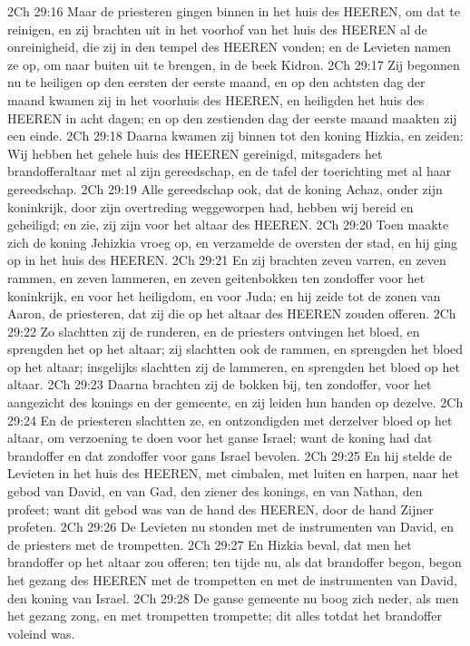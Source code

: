 2Ch 29:16  Maar de priesteren gingen binnen in het huis des HEEREN, om dat te reinigen, en zij brachten uit in het voorhof van het huis des HEEREN al de onreinigheid, die zij in den tempel des HEEREN vonden; en de Levieten namen ze op, om naar buiten uit te brengen, in de beek Kidron.
2Ch 29:17  Zij begonnen nu te heiligen op den eersten der eerste maand, en op den achtsten dag der maand kwamen zij in het voorhuis des HEEREN, en heiligden het huis des HEEREN in acht dagen; en op den zestienden dag der eerste maand maakten zij een einde.
2Ch 29:18  Daarna kwamen zij binnen tot den koning Hizkia, en zeiden: Wij hebben het gehele huis des HEEREN gereinigd, mitsgaders het brandofferaltaar met al zijn gereedschap, en de tafel der toerichting met al haar gereedschap.
2Ch 29:19  Alle gereedschap ook, dat de koning Achaz, onder zijn koninkrijk, door zijn overtreding weggeworpen had, hebben wij bereid en geheiligd; en zie, zij zijn voor het altaar des HEEREN.
2Ch 29:20  Toen maakte zich de koning Jehizkia vroeg op, en verzamelde de oversten der stad, en hij ging op in het huis des HEEREN.
2Ch 29:21  En zij brachten zeven varren, en zeven rammen, en zeven lammeren, en zeven geitenbokken ten zondoffer voor het koninkrijk, en voor het heiligdom, en voor Juda; en hij zeide tot de zonen van Aaron, de priesteren, dat zij die op het altaar des HEEREN zouden offeren.
2Ch 29:22  Zo slachtten zij de runderen, en de priesters ontvingen het bloed, en sprengden het op het altaar; zij slachtten ook de rammen, en sprengden het bloed op het altaar; insgelijks slachtten zij de lammeren, en sprengden het bloed op het altaar.
2Ch 29:23  Daarna brachten zij de bokken bij, ten zondoffer, voor het aangezicht des konings en der gemeente, en zij leiden hun handen op dezelve.
2Ch 29:24  En de priesteren slachtten ze, en ontzondigden met derzelver bloed op het altaar, om verzoening te doen voor het ganse Israel; want de koning had dat brandoffer en dat zondoffer voor gans Israel bevolen.
2Ch 29:25  En hij stelde de Levieten in het huis des HEEREN, met cimbalen, met luiten en harpen, naar het gebod van David, en van Gad, den ziener des konings, en van Nathan, den profeet; want dit gebod was van de hand des HEEREN, door de hand Zijner profeten.
2Ch 29:26  De Levieten nu stonden met de instrumenten van David, en de priesters met de trompetten.
2Ch 29:27  En Hizkia beval, dat men het brandoffer op het altaar zou offeren; ten tijde nu, als dat brandoffer begon, begon het gezang des HEEREN met de trompetten en met de instrumenten van David, den koning van Israel.
2Ch 29:28  De ganse gemeente nu boog zich neder, als men het gezang zong, en met trompetten trompette; dit alles totdat het brandoffer voleind was.
